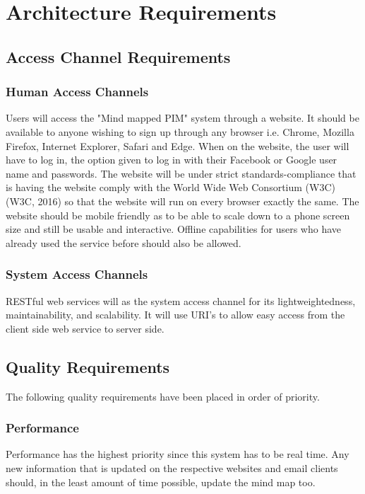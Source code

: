 \documentclass[hidelinks,english]{article}
\begin{document}
	\section{Architecture Requirements}
		
		\subsection{Access Channel Requirements}
    		\subsubsection{Human Access Channels}
                Users  will access the "Mind mapped PIM" system through a website. It should be available to anyone wishing to sign up  through any browser i.e. Chrome, Mozilla Firefox, Internet Explorer, Safari and Edge. When on the website, the user will have to log in, the option given to log in with their Facebook or Google user name and passwords.  The website will be under strict standards-compliance that is having the website comply with the World Wide Web Consortium (W3C) (W3C, 2016)  so that the website will run on every browser exactly the same. The website should be mobile friendly as to be able to scale down to a phone screen size and still be usable and interactive. Offline capabilities for users who have already used the service before should also be allowed.
            \subsubsection{System Access Channels}
                RESTful web services will as the system access channel for its lightweightedness, maintainability, and scalability. It will use URI's to allow easy access from the client side web service to server side. 
		
		\subsection{Quality Requirements}
            The following quality requirements have been placed in order of priority.
            \subsubsection{Performance}
                Performance has the highest priority since this system has to be real time. Any new information that is updated on the respective websites and email clients should, in the least amount of time possible, update the mind map too. \\
                
\end{document}
